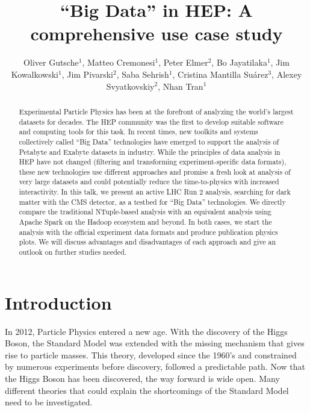 \documentclass[a4paper]{jpconf}
\begin{document}
\title{“Big Data” in HEP: A comprehensive use case study}

\author{Oliver Gutsche$^1$, Matteo Cremonesi$^1$, Peter Elmer$^2$, Bo Jayatilaka$^1$, Jim Kowalkowski$^1$, Jim Pivarski$^2$, Saba Sehrish$^1$, Cristina Mantilla Suárez$^3$, Alexey Svyatkovskiy$^2$, Nhan Tran$^1$}

\address{$^1$Fermi National Accelerator Laboratory, Batavia, IL, USA}
\address{$^2$Princeton University, Princeton, NJ, USA}
\address{$^3$Fermi National Accelerator Laboratory, Batavia, IL, USA; now Johns Hopkins University, Baltimore, MD, USA}


\begin{abstract}
Experimental Particle Physics has been at the forefront of analyzing the world’s largest datasets for decades. The HEP community was the first to develop suitable software and computing tools for this task. In recent times, new toolkits and systems collectively called “Big Data” technologies have emerged to support the analysis of Petabyte and Exabyte datasets in industry. While the principles of data analysis in HEP have not changed (filtering and transforming experiment-specific data formats), these new technologies use different approaches and promise a fresh look at analysis of very large datasets and could potentially reduce the time-to-physics with increased interactivity.
In this talk, we present an active LHC Run 2 analysis, searching for dark matter with the CMS detector, as a testbed for “Big Data” technologies. We directly compare the traditional NTuple-based analysis with an equivalent analysis using Apache Spark on the Hadoop ecosystem and beyond. In both cases, we start the analysis with the official experiment data formats and produce publication physics plots. We will discuss advantages and disadvantages of each approach and give an outlook on further studies needed.
\end{abstract}

\section{Introduction}

In 2012, Particle Physics entered a new age. With the discovery of the Higgs Boson, the Standard Model was extended with the missing mechanism that gives rise to particle masses. This theory, developed since the 1960's and constrained by numerous experiments before discovery, followed a predictable path. Now that the Higgs Boson has been discovered, the way forward is wide open. Many different theories that could explain the shortcomings of the Standard Model need to be investigated.
\end{document}
